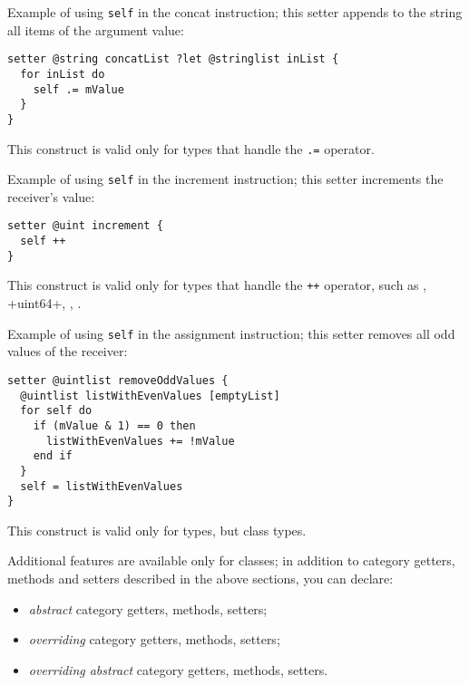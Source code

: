 Example of using \lstinline[language=galgas]!self! in the concat instruction; this setter appends to the string all items of the  argument value:
\begin{lstlisting}[language=galgas]
setter @string concatList ?let @stringlist inList {
  for inList do
    self .= mValue
  }
}
\end{lstlisting}
This construct is valid only for types that handle the \lstinline[language=galgas]!.=! operator.




Example of using \lstinline[language=galgas]!self! in the increment instruction; this setter increments the receiver's value:
\begin{lstlisting}[language=galgas]
setter @uint increment {
  self ++
}
\end{lstlisting}
This construct is valid only for types that handle the \lstinline[language=galgas]!++! operator, such as , \ggs+uint64+, , .





Example of using \lstinline[language=galgas]!self! in the assignment instruction; this setter removes all odd values of the receiver:
\begin{lstlisting}[language=galgas]
setter @uintlist removeOddValues {
  @uintlist listWithEvenValues [emptyList]
  for self do
    if (mValue & 1) == 0 then
      listWithEvenValues += !mValue
    end if
  }
  self = listWithEvenValues
}
\end{lstlisting}
This construct is valid only for types, but class types.












Additional features are available only for classes; in addition to category getters, methods and setters described in the above sections, you can declare:
\begin{itemize}
\item \emph{abstract} category getters, methods, setters;
\item \emph{overriding} category getters, methods, setters;
\item \emph{overriding abstract} category getters, methods, setters.
\end{itemize}

